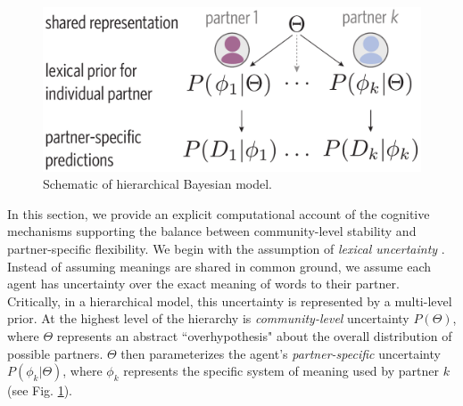 
\begin{figure}[t!]
\includegraphics[scale=0.4]{./figures/task1_model.pdf}
\caption{Schematic of hierarchical Bayesian model.}
\label{fig:model_schematic}
\end{figure}

In this section, we provide an explicit computational account of the cognitive mechanisms supporting the balance between community-level stability and partner-specific flexibility.
%
We begin with the assumption of \emph{lexical uncertainty} \cite{smith_learning_2013,bergen_pragmatic_2016}. 
Instead of assuming meanings are shared in common ground, we assume each agent has uncertainty over the exact meaning of words to their partner.
Critically, in a hierarchical model, this uncertainty is represented by a multi-level prior. 
At the highest level of the hierarchy is \emph{community-level} uncertainty $P(\Theta)$, where $\Theta$ represents an abstract ``overhypothesis" about the overall distribution of possible partners. 
$\Theta$ then parameterizes the agent's \emph{partner-specific} uncertainty $P(\phi_{k} | \Theta)$, where $\phi_k$ represents the specific system of meaning used by partner $k$ (see Fig. \ref{fig:model_schematic}). 

